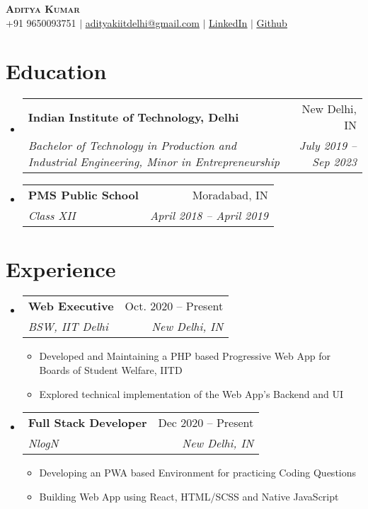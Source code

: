 \documentclass[letterpaper,11pt]{article}
\makeatletter
\newcommand{\resumeItem}[1]{
  \item\small{
    {#1 \vspace{-2pt}}
  }
}
\newcommand{\resumeSubheading}[4]{
  \vspace{-2pt}\item
    \begin{tabular*}{0.97\textwidth}[t]{l@{\extracolsep{\fill}}r}
      \textbf{#1} & #2 \\
      \textit{\small#3} & \textit{\small #4} \\
    \end{tabular*}\vspace{-7pt}
}
\newcommand{\resumeSubHeadingListStart}{\begin{itemize}[leftmargin=0.15in, label={}]}
\newcommand{\resumeSubHeadingListEnd}{\end{itemize}}
\newcommand{\resumeItemListStart}{\begin{itemize}}
\newcommand{\resumeItemListEnd}{\end{itemize}\vspace{-5pt}}
\makeatother
\begin{document}
\begin{center}
    \textbf{\Huge \scshape Aditya Kumar} \\ \vspace{5pt}
    \small+91 9650093751 $|$ \href{mailto:adityakiitdelhi@gmail.com}{\underline{adityakiitdelhi@gmail.com}} $|$ 
    \href{https://linkedin.com/in/aditya-kumar-inductor}{\underline{LinkedIn}} $|$
    \href{https://github.com/inductor69}{\underline{Github}}
\end{center}


\section{Education}
  \resumeSubHeadingListStart
    \resumeSubheading
      {Indian Institute of Technology, Delhi}{New Delhi, IN}
      {Bachelor of Technology in Production and Industrial Engineering, Minor in Entrepreneurship}{July 2019 -- Sep 2023}
    \resumeSubheading
      {PMS Public School}{Moradabad, IN}
      {Class XII}{April 2018 -- April 2019}
  \resumeSubHeadingListEnd


\section{Experience}
  \resumeSubHeadingListStart

    \resumeSubheading
      {Web Executive}{Oct. 2020 -- Present}
      {BSW, IIT Delhi}{New Delhi, IN}
      \resumeItemListStart
        \resumeItem{Developed and Maintaining a PHP based Progressive Web App for Boards of Student Welfare, IITD}
        \resumeItem{Explored technical implementation of the Web App's Backend and UI}
      \resumeItemListEnd

    \resumeSubheading
      {Full Stack Developer}{Dec 2020 -- Present}
      {NlogN}{New Delhi, IN}
      \resumeItemListStart
        \resumeItem{Developing an PWA based Environment for practicing Coding Questions}
        \resumeItem{Building Web App using React, HTML/SCSS and Native JavaScript}
   
    \resumeItemListEnd

  \resumeSubHeadingListEnd


\end{document}
